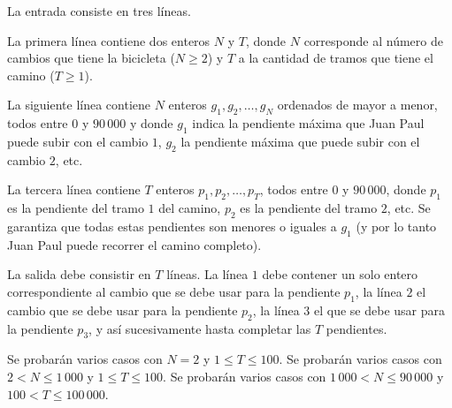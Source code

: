 \documentclass{oci}
\begin{document}
\begin{inputDescription}
La entrada consiste en tres líneas.

La primera línea contiene dos enteros $N$ y $T$, donde $N$ corresponde
al número de cambios que tiene la bicicleta ($N\geq 2$) y $T$ a la cantidad
de tramos que tiene el camino ($T\geq 1$).

La siguiente línea contiene $N$ enteros $g_1,g_2,\ldots, g_N$ ordenados de mayor
a menor, todos entre $0$ y $90\,000$ y donde $g_1$ indica la pendiente máxima que
Juan Paul puede subir con el cambio $1$, $g_2$ la pendiente máxima que puede
subir con el cambio $2$, etc.

La tercera línea contiene $T$ enteros $p_1,p_2,\ldots,p_T$, todos entre $0$ y $90\,000$, 
donde $p_1$ es la pendiente del tramo $1$ del camino, $p_2$ es la pendiente
del tramo $2$, etc.
Se garantiza que todas estas pendientes son menores o iguales a $g_1$ (y por lo tanto Juan Paul
puede recorrer el camino completo).
\end{inputDescription}

\begin{outputDescription}
La salida debe consistir en $T$ líneas.
La línea $1$ debe contener un solo entero correspondiente al cambio que se debe usar para la pendiente $p_1$,
la línea $2$ el cambio que se debe usar para la pendiente $p_2$, la línea $3$ el que se debe usar 
para la pendiente $p_3$, y así sucesivamente hasta completar las $T$ pendientes.
\end{outputDescription}

\begin{scoreDescription}
   Se probarán varios casos con $N=2$ y $1\leq T\leq 100$.
   Se probarán varios casos con $2 < N \leq 1\,000$ y $1\leq T\leq 100$.
   Se probarán varios casos con $1\,000< N \leq 90\,000$ y $100 <
  T\leq 100\,000$.
\end{scoreDescription}

\begin{sampleDescription}
\end{sampleDescription}
\end{document}

